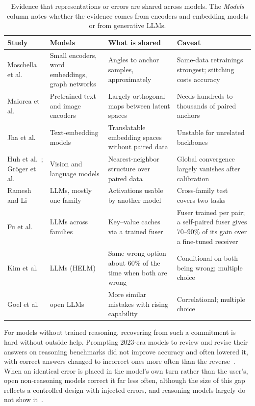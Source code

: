 \documentclass{ieeeaccess}
\newcommand{\rowgap}{\addlinespace[2.5pt]}
\begin{document}
\begin{table}[!t]
\caption{Evidence that representations or errors are shared across models. The \emph{Models} column notes whether the evidence comes from encoders and embedding models or from generative LLMs.}
\label{tab:crossmodel}
\centering
\footnotesize
\begin{tabular}{@{}>{\raggedright\arraybackslash}p{2.9cm}>{\raggedright\arraybackslash}p{4.1cm}>{\raggedright\arraybackslash}p{4.6cm}>{\raggedright\arraybackslash}p{4.9cm}@{}}
\toprule
\textbf{Study} & \textbf{Models} & \textbf{What is shared} & \textbf{Caveat} \\
\midrule
Moschella et al.~\cite{moschella2023relative} & Small encoders, word embeddings, graph networks & Angles to anchor samples, approximately & Same-data retrainings strongest; stitching costs accuracy \\
\rowgap Maiorca et al.~\cite{maiorca2023translation} & Pretrained text and image encoders & Largely orthogonal maps between latent spaces & Needs hundreds to thousands of paired anchors \\
\rowgap Jha et al.~\cite{jha2025vec2vec} & Text-embedding models & Translatable embedding spaces without paired data & Unstable for unrelated backbones \\
\rowgap Huh et al.~\cite{huh2024platonic}; Gr\"oger et al.~\cite{groger2026aristotelian} & Vision and language models & Nearest-neighbor structure over paired data & Global convergence largely vanishes after calibration \\
\rowgap Ramesh and Li~\cite{ramesh2025activations} & LLMs, mostly one family & Activations usable by another model & Cross-family test covers two tasks \\
\rowgap Fu et al.~\cite{fu2026c2c} & LLMs across families & Key--value caches via a trained fuser & Fuser trained per pair; a self-paired fuser gives 70--90\% of its gain over a fine-tuned receiver \\
\rowgap Kim et al.~\cite{kim2025correlated} & 71 LLMs (HELM) & Same wrong option about 60\% of the time when both are wrong & Conditional on both being wrong; multiple choice \\
\rowgap Goel et al.~\cite{goel2025think} & 130 open LLMs & More similar mistakes with rising capability & Correlational; multiple choice \\
\bottomrule
\end{tabular}
\end{table}

For models without trained reasoning, recovering from such a commitment is hard without outside help. Prompting 2023-era models to review and revise their answers on reasoning benchmarks did not improve accuracy and often lowered it, with correct answers changed to incorrect ones more often than the reverse~\cite{huang2024cannot}. When an identical error is placed in the model's own turn rather than the user's, open non-reasoning models correct it far less often, although the size of this gap reflects a controlled design with injected errors, and reasoning models largely do not show it~\cite{tsui2026blindspot}.
\end{document}
